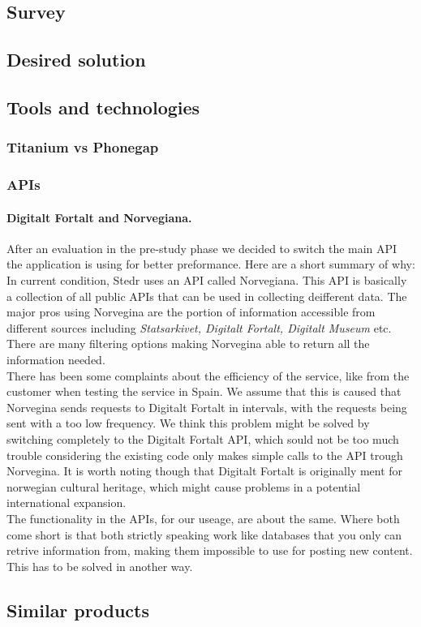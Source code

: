 		
	\subsection{Survey}

	
	\subsection{Desired solution}
	
	
	\subsection{Tools and technologies}
		\subsubsection{Titanium vs Phonegap}
		\subsubsection{APIs}

\paragraph{Digitalt Fortalt and Norvegiana.}
After an evaluation in the pre-study phase we decided to switch the main API the application is using for better preformance. Here are a short summary of why:\\[4pt]

In current condition, Stedr uses an API called Norvegiana. This API is basically a collection of all public APIs that can be used in collecting deifferent data. The major pros using Norvegina are the portion of information accessible from different sources including \emph{Statsarkivet, Digitalt Fortalt, Digitalt Museum} etc. There are many filtering options making Norvegina able to return all the information needed.\\
There has been some complaints about the efficiency of the service, like from the customer when testing the service in Spain. We assume that this is caused that Norvegina sends requests to Digitalt Fortalt in intervals, with the requests being sent with a too low frequency. We think this problem might be solved by switching completely to the Digitalt Fortalt API, which sould not be too much trouble considering the existing code only makes simple calls to the API trough Norvegina. It is worth noting though that Digitalt Fortalt is originally ment for norwegian cultural heritage, which might cause problems in a potential international expansion.\\
The functionality in the APIs, for our useage, are about the same. Where both come short is that both strictly speaking work like databases that you only can retrive information from, making them impossible to use for posting new content. This has to be solved in another way.\\ 


	\subsection{Similar products}
